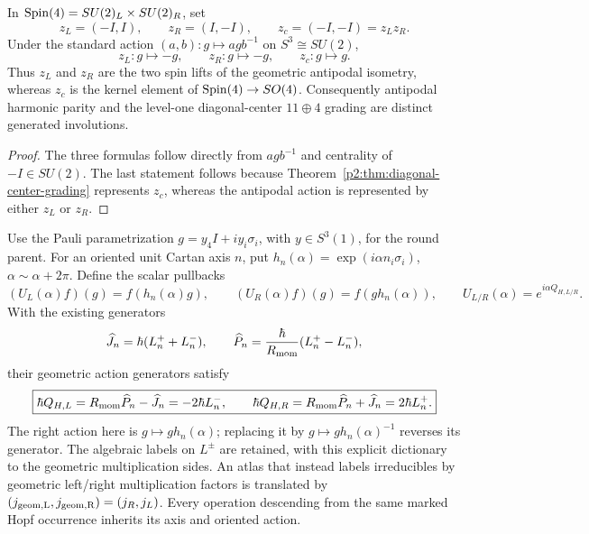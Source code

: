 \documentclass[12pt,a4paper]{article}
\begin{document}
\begin{theorem}
\label{p2d:thm:antipodal-lifts-center}
In \(\mathrm{Spin}(4)=SU(2)_L\times SU(2)_R\), set
\[
 z_L=(-I,I),\qquad z_R=(I,-I),\qquad z_c=(-I,-I)=z_Lz_R.
\]
Under the standard action \((a,b):g\mapsto agb^{-1}\) on \(S^3\cong SU(2)\),
\[
 z_L:g\mapsto-g,\qquad z_R:g\mapsto-g,\qquad z_c:g\mapsto g.
\]
Thus \(z_L\) and \(z_R\) are the two spin lifts of the geometric antipodal
isometry, whereas \(z_c\) is the kernel element of
\(\mathrm{Spin}(4)\to SO(4)\).  Consequently antipodal harmonic parity and the
level-one diagonal-center \(11\oplus4\) grading are distinct generated
involutions.
\end{theorem}

\begin{proof}
The three formulas follow directly from \(agb^{-1}\) and centrality of
\(-I\in SU(2)\).  The last statement follows because
Theorem~\ref{p2:thm:diagonal-center-grading} represents \(z_c\), whereas the
antipodal action is represented by either \(z_L\) or \(z_R\).
\end{proof}

\begin{corollary}
\label{p2d:cor:hopf-rotation-transvection}
Use the Pauli parametrization
\(g=y_4I+i y_i\sigma_i\), with \(y\in S^3(1)\), for the round parent.
For an oriented unit Cartan axis \(n\), put
\(h_n(\alpha)=\exp(i\alpha n_i\sigma_i)\), \(\alpha\sim\alpha+2\pi\).
Define the scalar pullbacks
\[
 (U_L(\alpha)f)(g)=f(h_n(\alpha)g),\qquad
 (U_R(\alpha)f)(g)=f(gh_n(\alpha)),
 \qquad U_{L/R}(\alpha)=e^{i\alpha Q_{H,L/R}}.
\]
With the existing generators
\[
 \widehat J_n=\hbar(L_n^++L_n^-),\qquad
 \widehat P_n=\frac{\hbar}{R_{\mathrm{mom}}}(L_n^+-L_n^-),
\]
their geometric action generators satisfy
\[
 \boxed{\hbar Q_{H,L}=R_{\mathrm{mom}}\widehat P_n-\widehat J_n
       =-2\hbar L_n^-,\qquad
        \hbar Q_{H,R}=R_{\mathrm{mom}}\widehat P_n+\widehat J_n
       =2\hbar L_n^+.}
\]
The right action here is \(g\mapsto gh_n(\alpha)\); replacing it by
\(g\mapsto gh_n(\alpha)^{-1}\) reverses its generator.
The algebraic labels on \(L^\pm\) are retained, with this explicit
dictionary to the geometric multiplication sides.  An atlas that instead
labels irreducibles by geometric left/right multiplication factors is
translated by \((j_{\rm geom,L},j_{\rm geom,R})=(j_R,j_L)\).
Every operation descending from the same marked Hopf occurrence inherits
its axis and oriented action.
\end{corollary}
\end{document}
